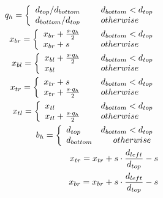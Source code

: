 \begin{align}
q_h = \left\{ 
	 \begin{array}{ll}
	 {d_{top}}/{d_{bottom}} &\mbox{\hspace{0.5cm}} d_{bottom}<d_{top}\\
	 {d_{bottom}}/{d_{top}} &\mbox{\hspace{0.5cm}} otherwise
	 \end{array} 
\right.\label{eq:points_qh}\\
x_{br}=\left\{ 
	 \begin{array}{ll}
	 {x_{br} + \frac{s\cdot q_h}{2}} &\mbox{\hspace{0.5cm}} d_{bottom}<d_{top}\\
	 {x_{br}} + s &\mbox{\hspace{0.5cm}} otherwise
	 \end{array}\right.\label{eq:points_br_x}\\
x_{bl}=\left\{ 
	 \begin{array}{ll}
	 {x_{bl} + \frac{s\cdot q_h}{2}} &\mbox{\hspace{0.5cm}} d_{bottom}<d_{top}\\
	 {x_{bl}} &\mbox{\hspace{0.5cm}} otherwise
	 \end{array}\right.\label{eq:points_bl_x}\\
x_{tr}=\left\{ 
	 \begin{array}{ll}
	 {x_{tr}} + s &\mbox{\hspace{0.5cm}} d_{bottom}<d_{top}\\
	 {x_{tr} + \frac{s\cdot q_h}{2}} &\mbox{\hspace{0.5cm}} otherwise
	 \end{array}\right.\label{eq:points_tr_x}\\
x_{tl}=\left\{ 
	 \begin{array}{ll}
	 {x_{tl}} &\mbox{\hspace{0.5cm}} d_{bottom}<d_{top}\\
	 {x_{tl} + \frac{s\cdot q_h}{2}} &\mbox{\hspace{0.5cm}} otherwise
	 \end{array}\right.\label{eq:points_tl_x}\\
b_h    =\left\{ 
	 \begin{array}{ll}
	 d_{top} &d_{bottom}<d_{top}\\
	 d_{bottom} &\mbox{\hspace{0.5cm}} otherwise
	 \end{array}\right.\label{eq:points_bh}\\
 x_{tr} = x_{tr} + s \cdot \frac{d_{left}}{d_{top}} - s\label{eq:points_tr_x_2}\\
 x_{br} = x_{br} + s \cdot \frac{d_{left}}{d_{top}} - s\label{eq:points_br_x_2}
\end{align}  


